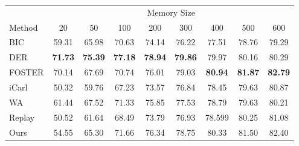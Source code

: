 \centering
\begin{tabular}{l|cccccccc}
\toprule
\multicolumn{1}{l|}{} & \multicolumn{8}{c}{Memory Size} \\
\cmidrule(l){2-9}
Method & 20 & 50 & 100 & 200 & 300 & 400 & 500 & 600\\
\midrule
BIC    & 59.31 & 65.98 & 70.63 & 74.14 & 76.22& 77.51 &  78.76 & 79.29 \\
DER    & \bf{71.73} & \bf{75.39} & \bf{77.18} & \bf{78.94} & \bf{79.86} & 79.97 &  80.16 & 80.29\\
FOSTER & 70.14 & 67.69 & 70.74 & 76.01 & 79.03 & \bf{80.94} &  \bf{81.87} & \bf{82.79} \\
iCarl  & 50.32 & 59.76 & 67.23 & 73.57 & 76.84 & 78.45 & 79.63 & 80.87\\
WA     & 61.44 & 67.52 & 71.33 & 75.85 & 77.53 & 78.79&   79.63 & 80.21\\
Replay & 50.52 & 61.64 & 68.49 & 73.79 & 76.93 & 78.599 & 80.25 & 81.08\\
\midrule
Ours   & 54.55 & 65.30 & 71.66 & 76.34 & 78.75 & 80.33 & 81.50  & 82.40\\
\bottomrule
\end{tabular}

\begin{comment}

\begin{tabular}{@{}l|rrrrrrr@{}} %
\toprule
\textbf{Memory Size} & BIC & DER & Foster & iCarl & WA & Replay & Ours \\
\midrule
20  & 54.28 & 64.30 & 65.83 & 49.56 & 60.87 & 48.92 & 52.25\\
40  & 60.48 & 67.56& 64.95& 57.74& 64.15& 56.59& 59.94\\
60  & & & & & & &  \\
80  & & & & & & &   \\
100  & & & & & &  &  \\
120  & & & & & & & \\
140  & & & & &  & &  \\
160  & & & & &  & &  \\
180  & & & & & & &  \\
200  & & & &  & & &  \\
220  & & & &  & & &  \\
240  & & & &  & & &  \\
260  & & & &  & & &  \\
280  & & & &  & & &  \\
300  & & & &  & & &  \\
350  & & & &  & & & \\
400  & & & &  & & & \\
450  & & & &  & & &  \\
500  & & & &  & & & \\


\bottomrule
\end{tabular}
\end{comment}
